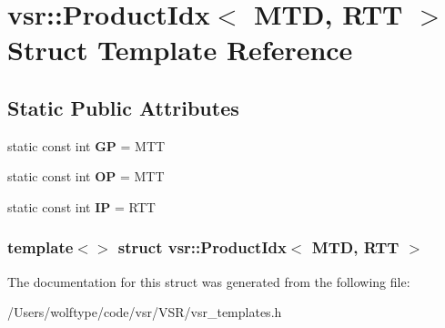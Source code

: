 \hypertarget{structvsr_1_1_product_idx_3_01_m_t_d_00_01_r_t_t_01_4}{\section{vsr\-:\-:Product\-Idx$<$ M\-T\-D, R\-T\-T $>$ Struct Template Reference}
\label{structvsr_1_1_product_idx_3_01_m_t_d_00_01_r_t_t_01_4}
}
\subsection*{Static Public Attributes}
\begin{DoxyCompactItemize}
\item 
\hypertarget{structvsr_1_1_product_idx_3_01_m_t_d_00_01_r_t_t_01_4_a6e3d1a2894260ca2c0d56655de3068dc}{static const int {\bfseries G\-P} = M\-T\-T}\label{structvsr_1_1_product_idx_3_01_m_t_d_00_01_r_t_t_01_4_a6e3d1a2894260ca2c0d56655de3068dc}

\item 
\hypertarget{structvsr_1_1_product_idx_3_01_m_t_d_00_01_r_t_t_01_4_a6a2c0cd1205ebbe0a6d99723b4ef3c94}{static const int {\bfseries O\-P} = M\-T\-T}\label{structvsr_1_1_product_idx_3_01_m_t_d_00_01_r_t_t_01_4_a6a2c0cd1205ebbe0a6d99723b4ef3c94}

\item 
\hypertarget{structvsr_1_1_product_idx_3_01_m_t_d_00_01_r_t_t_01_4_aeafb3056862168c0371ee7cdf9a60703}{static const int {\bfseries I\-P} = R\-T\-T}\label{structvsr_1_1_product_idx_3_01_m_t_d_00_01_r_t_t_01_4_aeafb3056862168c0371ee7cdf9a60703}

\end{DoxyCompactItemize}
\subsubsection*{template$<$$>$ struct vsr\-::\-Product\-Idx$<$ M\-T\-D, R\-T\-T $>$}



The documentation for this struct was generated from the following file\-:\begin{DoxyCompactItemize}
\item 
/\-Users/wolftype/code/vsr/\-V\-S\-R/vsr\-\_\-templates.\-h\end{DoxyCompactItemize}
